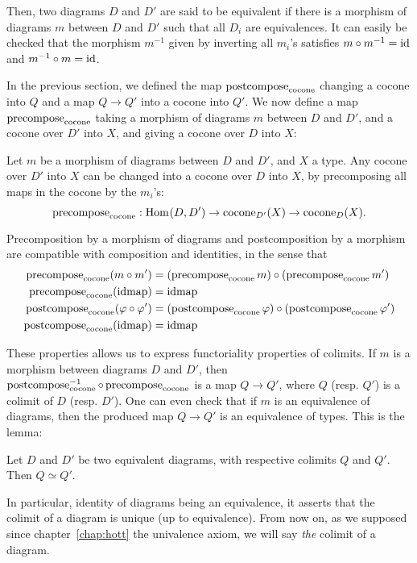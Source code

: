 Then, two diagrams $D$ and $D'$ are said to be equivalent if there is
a morphism of diagrams $m$ between $D$ and $D'$ such that all $D_i$
are equivalences. It can easily be checked that the morphism $m^{-1}$
given by inverting all $m_i$'s satisfies $m\circ m^{-1} = \operatorname{id}$ and
$m^{-1} \circ m = \operatorname{id}$.

In the previous section, we defined the map
$\operatorname{\mathrm{postcompose}}_{\mathrm{cocone}}$ changing a cocone into $Q$ and a map
$Q\to Q'$ into a cocone into $Q'$. We now define a map
$\operatorname{\mathrm{precompose}}_{\mathrm{cocone}}$ taking a morphism of diagrams $m$
between $D$ and $D'$, and a cocone over $D'$ into $X$, and giving a
cocone over $D$ into $X$:
\begin{defi}
  Let $m$ be a morphism of diagrams between $D$ and $D'$, and $X$ a
  type.
  Any cocone over $D'$ into $X$ can be changed into a cocone over $D$
  into $X$, by precomposing all maps in the cocone by the $m_i$'s:
  \[
    \operatorname{\mathrm{precompose}}_{\mathrm{cocone}} : \mathrm{Hom}_{}(D,D') \to \operatorname{cocone}_{D'}(X) \to \operatorname{cocone}_D(X).
  \]
\end{defi}

Precomposition by a morphism of diagrams and postcomposition by a
morphism are compatible with
composition and identities, in the sense that
\begin{align*}
  \operatorname{\mathrm{precompose}}_{\mathrm{cocone}} (m\circ m') &= (\operatorname{\mathrm{precompose}}_{\mathrm{cocone}} m) \circ
  (\operatorname{\mathrm{precompose}}_{\mathrm{cocone}} m') \\
  \operatorname{\mathrm{precompose}}_{\mathrm{cocone}} (\operatorname{\mathrm{idmap}}) &= \operatorname{\mathrm{idmap}} \\
  \operatorname{\mathrm{postcompose}}_{\mathrm{cocone}} (\varphi \circ \varphi') &= (\operatorname{\mathrm{postcompose}}_{\mathrm{cocone}} \varphi) \circ
  (\operatorname{\mathrm{postcompose}}_{\mathrm{cocone}} \varphi') \\
  \operatorname{\mathrm{postcompose}}_{\mathrm{cocone}} (\operatorname{\mathrm{idmap}}) &= \operatorname{\mathrm{idmap}} 
\end{align*}

These properties allows us to express functoriality properties of
colimits. If $m$ is a morphism between diagrams $D$ and $D'$, then
$\operatorname{\mathrm{postcompose}}_{\mathrm{\operatorname{cocone}}}^{-1} \circ
\operatorname{\mathrm{precompose}}_{\mathrm{cocone}}$ is a map $Q \to Q'$, where $Q$
(resp. $Q'$) is a colimit of $D$ (resp. $D'$). One can even check that
if $m$ is an equivalence of diagrams, then the produced map $Q\to Q'$
is an equivalence of types. This is the lemma:
\begin{lem}
  Let $D$ and $D'$ be two equivalent diagrams, with respective
  colimits $Q$ and $Q'$. Then $Q\simeq Q'$.
\end{lem}
In particular, identity of diagrams being an equivalence, it asserts
that the colimit of a diagram is unique (up to equivalence). From now
on, as we supposed since chapter~\ref{chap:hott} the univalence axiom,
we will say {\em the} colimit of a diagram.

